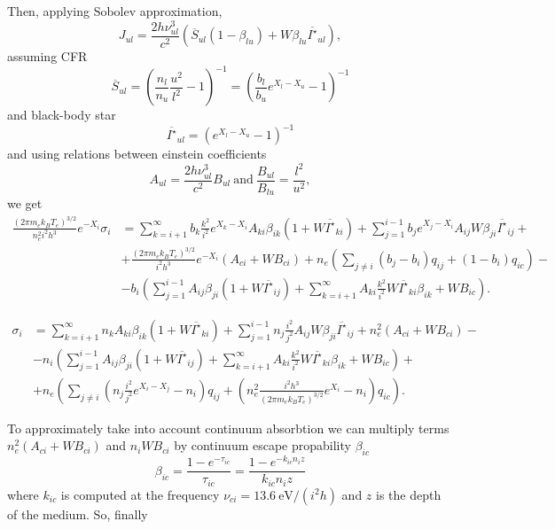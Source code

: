 \documentclass{article}
\begin{document}
Then, applying Sobolev approximation,
\[
J_{ul} = \frac{2h\nu_{ul}^3}{c^2}\left(\overline{S}_{ul}(1-\beta_{lu}) + W\beta_{lu} \overline{I^\star}_{ul}\right),
\]
assuming CFR
\[
\overline{S}_{ul} = \left(\frac{n_l}{n_u}\frac{u^2}{l^2} - 1\right)^{-1} = \left(\frac{b_l}{b_u}e^{X_l-X_u} - 1\right)^{-1}
\]
and black-body star
\[
\overline{I^\star}_{ul} = \left(e^{X_l - X_u} - 1\right)^{-1}
\]
and using relations between einstein coefficients
\[
A_{ul} = \frac{2h\nu_{ul}^3}{c^2}B_{ul}\ \mathrm{and}\ \frac{B_{ul}}{B_{lu}} = \frac{l^2}{u^2},
\]
we get
\begin{equation}
    \begin{aligned}
        \frac{(2\pi m_ek_BT_e)^{3/2}}{n_e^2i^2h^3}e^{-X_i}\sigma_i &= \sum\limits_{k=i+1}^\infty b_k\frac{k^2}{i^2}e^{X_k-X_i}A_{ki}\beta_{ik}(1 + W\overline{I^\star}_{ki}) + \sum\limits_{j=1}^{i-1} b_je^{X_j-X_i}A_{ij}W\beta_{ji} \overline{I^\star}_{ij} +\\
        &+\frac{(2\pi m_ek_BT_e)^{3/2}}{i^2h^3}e^{-X_i}(A_{ci} + WB_{ci}) +n_e\left(\sum\limits_{j \neq i}(b_j-b_i)q_{ij}  + (1-b_i)q_{ic}\right)-\\
        &-b_i\left(\sum\limits_{j=1}^{i-1}A_{ij}\beta_{ji}(1 + W\overline{I^\star}_{ij}) + \sum\limits_{k=i+1}^\infty A_{ki}\frac{k^2}{i^2}W\overline{I^\star}_{ki}\beta_{ik}  + WB_{ic}\right).
    \end{aligned}
\end{equation}

\begin{equation}
    \begin{aligned}
        \sigma_i &= \sum\limits_{k=i+1}^\infty n_kA_{ki}\beta_{ik}(1 + W\overline{I^\star}_{ki}) + \sum\limits_{j=1}^{i-1} n_j\frac{i^2}{j^2}A_{ij}W\beta_{ji} \overline{I^\star}_{ij} +n_e^2(A_{ci} + WB_{ci}) -\\
        &-n_i\left(\sum\limits_{j=1}^{i-1}A_{ij}\beta_{ji}(1 + W\overline{I^\star}_{ij}) + \sum\limits_{k=i+1}^\infty A_{ki}\frac{k^2}{i^2}W\overline{I^\star}_{ki}\beta_{ik}  + WB_{ic}\right) +\\
        &+n_e\left(\sum\limits_{j \neq i}\left(n_j\frac{i^2}{j^2}e^{X_i-X_j}-n_i\right)q_{ij}  + \left(n_e^2\frac{i^2h^3}{(2\pi m_ek_BT_e)^{3/2}}e^{X_i}-n_i\right)q_{ic}\right). 
    \end{aligned}
\end{equation}

To approximately take into account continuum absorbtion we can multiply terms \(n_e^2(A_{ci} + WB_{ci})\) and \(n_iWB_{ci}\) by continuum escape propability \(\beta_{ic}\)
\[
    \beta_{ic} = \frac{1 - e^{-\tau_{ic}}}{\tau_{ic}} = \frac{1 - e^{-k_{ic}n_iz}}{k_{ic}n_iz} 
\] 
where \(k_{ic}\) is computed at the frequency \(\nu_{ci} = 13.6\ \mathrm{eV}/(i^2h)\) and \(z\) is the depth of the medium. So, finally
\end{document}
